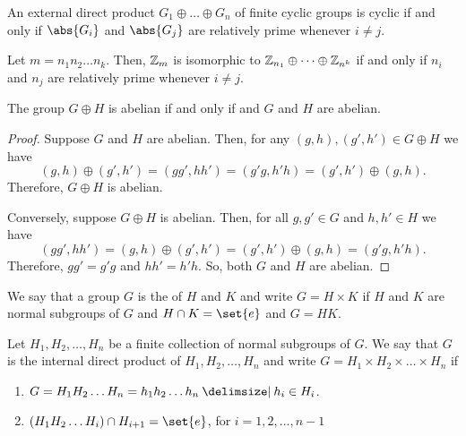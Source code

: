 \documentclass[11pt]{penrose}
\begin{document}
\begin{ncor}
    An external direct product $G_{1} \oplus \dots \oplus G_{n}$ of finite cyclic groups is cyclic if and only if $\abs{G_{i}}$ and $\abs{G_{j}}$ are relatively prime whenever $i \neq j$.
\end{ncor}

\begin{ncor}
    Let $m = n_{1} n_{2} \dots n_{k}$. Then, $\mathbb{Z}_{m}$ is isomorphic to $\mathbb{Z}_{n_{1}} \oplus \dots \oplus \mathbb{Z}_{n^{k}}$ if and only if $n_{i}$ and $n_{j}$ are relatively prime whenever $i \neq j$.
\end{ncor}

\begin{nlemma}
    The group $G \oplus H$ is abelian if and only if and $G$ and $H$ are abelian.
\end{nlemma}
\begin{proof}
    Suppose $G$ and $H$ are abelian. Then, for any $(g,h), (g',h') \in G \oplus H$ we have
    \begin{equation*}
        (g,h) \oplus (g',h')
        = (gg', hh')
        = (g'g, h'h)
        = (g',h') \oplus (g,h).
    \end{equation*}
    Therefore, $G \oplus H$ is abelian.

    Conversely, suppose $G \oplus H$ is abelian. Then, for all $g, g' \in G$ and $h, h' \in H$ we have
    \begin{equation*}
        (gg', hh')
        = (g,h) \oplus (g',h')
        = (g',h') \oplus (g,h)
        = (g'g, h'h).
    \end{equation*}
    Therefore, $gg' = g'g$ and $hh' = h'h$. So, both $G$ and $H$ are abelian.
\end{proof}

\begin{ndfn}
    We say that a group $G$ is the  of $H$ and $K$ and write $G = H \times K$ if $H$ and $K$ are normal subgroups of $G$ and $H \cap K = \set{e}$ and $G = HK$.
\end{ndfn}

\begin{ndfn}
    Let $H_{1}, H_{2}, \dots, H_{n}$ be a finite collection of normal subgroups of $G$. We say that $G$ is the internal direct product of $H_{1}, H_{2}, \dots, H_{n}$ and write $G = H_{1} \times H_{2} \times \dots \times H_{n}$ if
    \begin{enumerate}
        \item $G = H_{1} H_{2} \dots H_{n} = {h_{1} h_{2} \dots h_{n} \st h_{i} \in H_{i}}$.
        \item $(H_{1} H_{2} \dots H_{i}) \cap H_{i+1} = \set{e}$, for $i = 1,2,\dots,n-1$
    \end{enumerate}
\end{ndfn}
\end{document}
